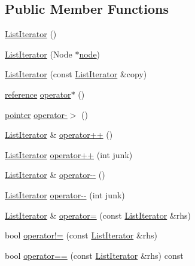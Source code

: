 \subsection*{Public Member Functions}
\begin{DoxyCompactItemize}
\item 
\hyperlink{structprism_1_1containers_1_1_list_iterator_a9ba573488cb416eda5b8ed7b06ec84b6}{List\+Iterator} ()
\item 
\hyperlink{structprism_1_1containers_1_1_list_iterator_a1057f0e76d643e3d82b819e6d190bac1}{List\+Iterator} (Node $\ast$\hyperlink{structprism_1_1containers_1_1_list_iterator_ac9b55317f6af025037e1fad2b35c3e11}{node})
\item 
\hyperlink{structprism_1_1containers_1_1_list_iterator_aa30c6c654bd7745071ca15725f520f6d}{List\+Iterator} (const \hyperlink{structprism_1_1containers_1_1_list_iterator}{List\+Iterator} \&copy)
\item 
\hyperlink{structprism_1_1containers_1_1_list_iterator_a70680642555c1d031e3e99e66b89680d}{reference} \hyperlink{structprism_1_1containers_1_1_list_iterator_ad4070c22375d4117b7d9c8cd63277011}{operator$\ast$} ()
\item 
\hyperlink{structprism_1_1containers_1_1_list_iterator_a2e2390561608db7ef1938a21f32e7314}{pointer} \hyperlink{structprism_1_1containers_1_1_list_iterator_a01f32519e3e8ac1e92067617dbaf7e57}{operator-\/$>$} ()
\item 
\hyperlink{structprism_1_1containers_1_1_list_iterator}{List\+Iterator} \& \hyperlink{structprism_1_1containers_1_1_list_iterator_a2f27309d86550ea64adc8918c565cbdb}{operator++} ()
\item 
\hyperlink{structprism_1_1containers_1_1_list_iterator}{List\+Iterator} \hyperlink{structprism_1_1containers_1_1_list_iterator_a72ed72136a5e6e0b6173ea25eb6a6424}{operator++} (int junk)
\item 
\hyperlink{structprism_1_1containers_1_1_list_iterator}{List\+Iterator} \& \hyperlink{structprism_1_1containers_1_1_list_iterator_a397193ecc60792f0324f907870adb3b9}{operator-\/-\/} ()
\item 
\hyperlink{structprism_1_1containers_1_1_list_iterator}{List\+Iterator} \hyperlink{structprism_1_1containers_1_1_list_iterator_a00711a2ed787279645ea422db8937842}{operator-\/-\/} (int junk)
\item 
\hyperlink{structprism_1_1containers_1_1_list_iterator}{List\+Iterator} \& \hyperlink{structprism_1_1containers_1_1_list_iterator_a3ecbba9e0fbd38bc482eb3544b9eab2c}{operator=} (const \hyperlink{structprism_1_1containers_1_1_list_iterator}{List\+Iterator} \&rhs)
\item 
bool \hyperlink{structprism_1_1containers_1_1_list_iterator_a255720558e3bce376a565adeb03a782d}{operator!=} (const \hyperlink{structprism_1_1containers_1_1_list_iterator}{List\+Iterator} \&rhs)
\item 
bool \hyperlink{structprism_1_1containers_1_1_list_iterator_a05589309ef39e7f87e58885971c502dc}{operator==} (const \hyperlink{structprism_1_1containers_1_1_list_iterator}{List\+Iterator} \&rhs) const 
\end{DoxyCompactItemize}
